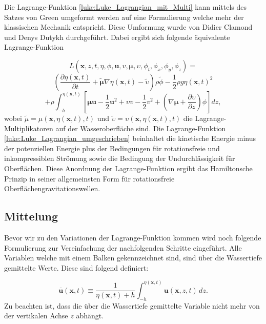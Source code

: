 Die Lagrange-Funktion \eqref{luke:Luke_Lagrangian_mit_Multi} kann mittels des Satzes von Green umgeformt werden auf eine Formulierung welche mehr der klassischen Mechanik entspricht.
Diese Umformung wurde von Didier Clamond und Denys Dutykh \cite{luke:CLAMOND201225} durchgeführt. Dabei ergibt sich folgende äquivalente Lagrange-Funktion

\[
L(\bm{x},z,t,\eta,\phi,\bm{u}, v, \bm{\mu},\upsilon,\phi_t,\phi_x,\phi_y,\phi_z)
=
\]
\[
\left(\frac{\partial \eta(\bm{x},t)}{\partial t}
+
\tilde{\bm{\mu}} \nabla \eta(\bm{x},t)
-
\tilde{\upsilon}\right) \rho\tilde{\phi}
-
\frac{1}{2} \rho g \eta(\bm{x},t)^2
\]
\begin{equation}
	+
	\rho
	\int_{-h}^{\eta(\bm{x},t)} \left[ \bm{\mu}  \bm{u} - \frac{1}{2} \bm{u}^2 + \upsilon v - \frac{1}{2} v^2 + \left(\nabla \bm{\mu} + \frac{\partial \upsilon}{\partial z}\right) \phi \right] dz,
	\label{luke:Luke_Lagrangian_umgeschrieben}
\end{equation}
wobei $\tilde{\mu} = \mu(\bm{x},\eta(\bm{x},t),t)$ und $\tilde{\upsilon} = \upsilon(\bm{x},\eta(\bm{x},t),t)$ die Lagrange-Multiplikatoren auf der Wasseroberfläche sind.
Die Lagrange-Funktion \eqref{luke:Luke_Lagrangian_umgeschrieben} beinhaltet die kinetische Energie minus der potenziellen Energie plus der Bedingungen für rotationsfreie und inkompressiblen Strömung sowie die Bedingung der Undurchlässigkeit für Oberflächen.
Diese Anordnung der Lagrange-Funktion ergibt das Hamiltonsche Prinzip in seiner allgemeinsten Form für rotationsfreie Oberflächengravitationswellen.

\subsection{Mittelung}
Bevor wir zu den Variationen der Lagrange-Funktion kommen wird noch folgende Formulierung zur Vereinfachung der nachfolgenden Schritte eingeführt.
Alle Variablen welche mit einem Balken gekennzeichnet sind, sind über die Wassertiefe gemittelte Werte. Diese sind folgend definiert:

\begin{equation}
	\overline{\bm{u}}(\bm{x}, t) \equiv \frac{1}{\eta(\bm{x}, t) + h} \int_{-h}^{\eta(\bm{x},t)} \bm{u}(\bm{x},z,t) \, dz.
	\label{luke:Mittelung_Wassertiefe}
\end{equation}
Zu beachten ist, dass die über die Wassertiefe gemittelte Variable nicht mehr von der vertikalen Achse $z$ abhängt.

